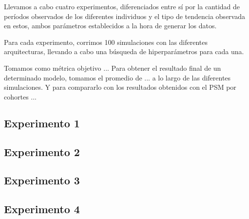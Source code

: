 \documentclass[../main.tex]{subfiles}
\begin{document}
Llevamos a cabo cuatro experimentos, diferenciados entre sí por la cantidad de períodos
observados de los diferentes individuos y el tipo de tendencia observada en estos,
ambos parámetros establecidos a la hora de generar los datos.

Para cada experimento, corrimos 100 simulaciones con las diferentes arquitecturas,
llevando a cabo una búsqueda de hiperparámetros para cada una.

Tomamos como métrica objetivo ... Para obtener el resultado final de un determinado
modelo, tomamos el promedio de ... a lo largo de las diferentes simulaciones. Y para
compararlo con los resultados obtenidos con el PSM por cohortes ...

\subsection{Experimento 1}

\subsection{Experimento 2}

\subsection{Experimento 3}

\subsection{Experimento 4}
\end{document}
